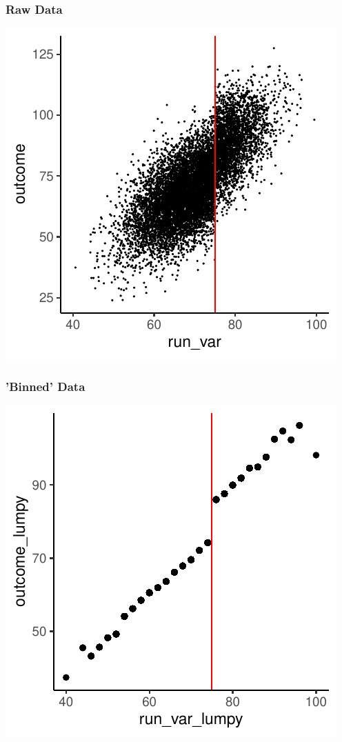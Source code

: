 \documentclass[xcolor=x11names,compress]{beamer}\usepackage[]{graphicx}\usepackage[]{xcolor}
\makeatletter
\def\maxwidth{ %
  \ifdim\Gin@nat@width>\linewidth
    \linewidth
  \else
    \Gin@nat@width
  \fi
}
\newenvironment{knitrout}{}{} %
\renewcommand{\(}{\begin{columns}}
\renewcommand{\)}{\end{columns}}
\newcommand{\<}[1]{\begin{column}{#1}}
\renewcommand{\>}{\end{column}}
\makeatother
\begin{document}
\begin{frame}
\frametitle{Raw Data}
\begin{center}
\begin{knitrout}
\color{fgcolor}
\includegraphics[width=\maxwidth]{figure/chart1-1} 
\end{knitrout}
\end{center}
\end{frame}

\begin{frame}
\frametitle{'Binned' Data}
\begin{center}
\begin{knitrout}
\color{fgcolor}
\includegraphics[width=\maxwidth]{figure/chart2-1} 
\end{knitrout}
\end{center}
\end{frame}
\end{document}
